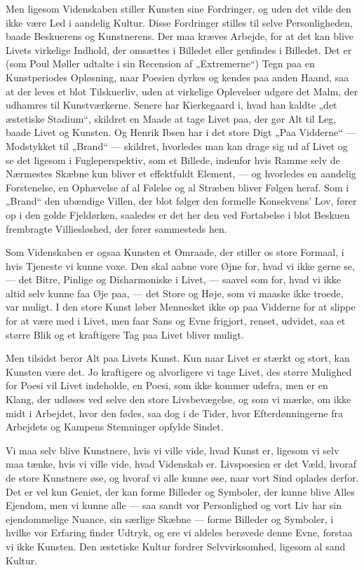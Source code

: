 \documentclass[12pt,a4paper,openany]{book}
\newcommand{\opage}[1]{\marginnote{\footnotesize\textit{[#1]}}}
\begin{document}
Men ligesom Videnskaben stiller Kunsten sine Fordringer,
og uden det vilde den ikke være Led i aandelig Kultur. Disse
Fordringer stilles til selve Personligheden, baade Beskuerens og
Kunstnerens. Der maa kræves Arbejde, for at det kan blive Livets
virkelige Indhold, der omsættes i Billedet eller genfindes i Billedet.
Det er (som Poul Møller udtalte i sin Recension af
„Extremerne“) Tegn paa en Kunstperiodes Opløsning, naar
Poesien dyrkes og kendes paa anden Haand, saa at der leves
et blot Tilskuerliv, uden at virkelige Oplevelser udgøre det
Malm, der udhamres til Kunstværkerne. Senere har Kierkegaard
i, hvad han kaldte „det æstetiske Stadium“, skildret en
Maade at tage Livet paa, der gør Alt til Leg, baade Livet og
Kunsten. Og Henrik Ibsen har i det store Digt „Paa Vidderne“
--- Modstykket til „Brand“ --- skildret, hvorledes man
kan drage sig ud af Livet og se det ligesom i Fugleperspektiv,
som et Billede, indenfor hvis Ramme selv de Nærmestes Skæbne
kun bliver et effektfuldt Element, --- og hvorledes en aandelig
Forstenelse, en Ophævelse af al Følelse og al Stræben bliver
Følgen heraf. Som i „Brand“ den ubændige Villen, der blot
følger den formelle Konsekvens’ Lov, fører op i den golde Fjeldørken,
saaledes er det her den ved Fortabelse i blot Beskuen
frembragte Villiesløshed, der fører sammesteds hen.

Som Videnskaben er ogsaa Kunsten et Omraade, der stiller
\setcounter{footnote}{0}%
\opage{10}os store Formaal, i hvis Tjeneste vi kunne voxe. Den skal
aabne vore Øjne for, hvad vi ikke gerne se, --- det Bitre,
Pinlige og Disharmoniske i Livet, --- saavel som for, hvad vi ikke
altid selv kunne faa Øje paa, --- det Store og Høje, som vi
maaske ikke troede, var muligt. I den store Kunst løber Mennesket
ikke op paa Vidderne for at slippe for at være med i
Livet, men faar Sans og Evne frigjort, renset, udvidet, saa et
større Blik og et kraftigere Tag paa Livet bliver muligt.

Men tilsidst beror Alt paa Livets Kunst. Kun naar Livet
er stærkt og stort, kan Kunsten være det. Jo kraftigere og
alvorligere vi tage Livet, des større Mulighed for Poesi vil
Livet indeholde, en Poesi, som ikke kommer udefra, men er
en Klang, der udløses ved selve den store Livsbevægelse, og
som vi mærke, om ikke midt i Arbejdet, hvor den fødes, saa
dog i de Tider, hvor Efterdønningerne fra Arbejdets og Kampens
Stemninger opfylde Sindet.

Vi maa selv blive Kunstnere, hvis vi ville vide, hvad
Kunst er, ligesom vi selv maa tænke, hvis vi ville vide, hvad
Videnskab er. Livspoesien er det Væld, hvoraf de store Kunstnere
øse, og hvoraf vi alle kunne øse, naar vort Sind oplades
derfor. Det er vel kun Geniet, der kan forme Billeder og
Symboler, der kunne blive Alles Ejendom, men vi kunne alle
--- saa sandt vor Personlighed og vort Liv har sin ejendommelige
Nuance, sin særlige Skæbne --- forme Billeder og Symboler,
i hvilke vor Erfaring finder Udtryk, og ere vi aldeles
berøvede denne Evne, forstaa vi ikke Kunsten. Den æstetiske
Kultur fordrer Selvvirksomhed, ligesom al sand Kultur.
\end{document}
